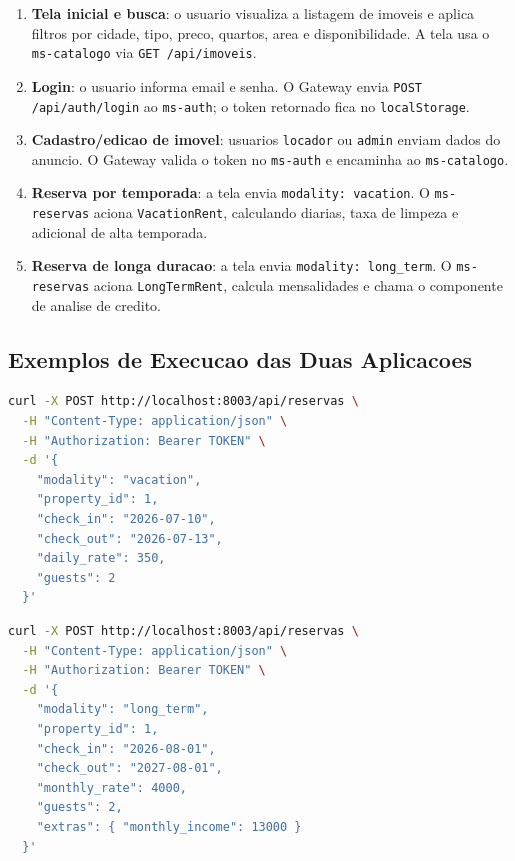 \documentclass[12pt,a4paper]{article}
\begin{document}
\begin{enumerate}
    \item \textbf{Tela inicial e busca}: o usuario visualiza a listagem de imoveis e
    aplica filtros por cidade, tipo, preco, quartos, area e disponibilidade. A tela
    usa o \texttt{ms-catalogo} via \texttt{GET /api/imoveis}.
    \item \textbf{Login}: o usuario informa email e senha. O Gateway envia
    \texttt{POST /api/auth/login} ao \texttt{ms-auth}; o token retornado fica no
    \texttt{localStorage}.
    \item \textbf{Cadastro/edicao de imovel}: usuarios \texttt{locador} ou
    \texttt{admin} enviam dados do anuncio. O Gateway valida o token no
    \texttt{ms-auth} e encaminha ao \texttt{ms-catalogo}.
    \item \textbf{Reserva por temporada}: a tela envia \texttt{modality: vacation}.
    O \texttt{ms-reservas} aciona \texttt{VacationRent}, calculando diarias, taxa de
    limpeza e adicional de alta temporada.
    \item \textbf{Reserva de longa duracao}: a tela envia
    \texttt{modality: long\_term}. O \texttt{ms-reservas} aciona
    \texttt{LongTermRent}, calcula mensalidades e chama o componente de analise de
    credito.
\end{enumerate}

\subsection{Exemplos de Execucao das Duas Aplicacoes}
\begin{lstlisting}[language=bash,caption={Criacao de reserva por temporada.}]
curl -X POST http://localhost:8003/api/reservas \
  -H "Content-Type: application/json" \
  -H "Authorization: Bearer TOKEN" \
  -d '{
    "modality": "vacation",
    "property_id": 1,
    "check_in": "2026-07-10",
    "check_out": "2026-07-13",
    "daily_rate": 350,
    "guests": 2
  }'
\end{lstlisting}

\begin{lstlisting}[language=bash,caption={Criacao de reserva de longa duracao.}]
curl -X POST http://localhost:8003/api/reservas \
  -H "Content-Type: application/json" \
  -H "Authorization: Bearer TOKEN" \
  -d '{
    "modality": "long_term",
    "property_id": 1,
    "check_in": "2026-08-01",
    "check_out": "2027-08-01",
    "monthly_rate": 4000,
    "guests": 2,
    "extras": { "monthly_income": 13000 }
  }'
\end{lstlisting}
\end{document}
